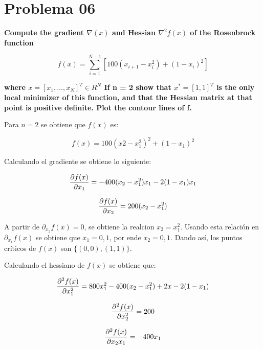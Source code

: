 \pagebreak

\section*{Problema 06}

\textbf{Compute the gradient $\nabla (x)$ and Hessian $\nabla^2 f (x)$ of the Rosenbrock function}

\begin{equation*}
    f(x) = \sum_{i=1}^{N-1}[100(x_{i+1}-x_i^2)+(1-x_i)^2]
\end{equation*}

\textbf{where $x = [x_1 ,\dots, x_N ]^T \in R^N$ If n = 2 show that $x^*  = [1, 1]^T$ is the only local minimizer of this function, and that the Hessian matrix at that point is positive definite. Plot the contour lines of f.}

Para $n=2$ se obtiene que $f(x)$ es:

\begin{equation*}
    f(x) = 100(x2-x_1^2)^2 +(1-x_1)^2
\end{equation*}

Calculando el gradiente se obtiene lo siguiente:

\begin{equation*}
    \frac{\partial f(x)}{\partial x_1} = -400(x_2-x_1^2)x_1 -2(1-x_1)x_1
\end{equation*}

\begin{equation*}
    \frac{\partial f(x)}{\partial x_2} = 200(x_2-x_1^2)
\end{equation*}

A partir de $\partial_{x_2} f(x)=0$, se obtiene la realcion $x_2=x_1^2$. Usando esta relación en $\partial_{x_1}f(x)$ se obtiene que $x_1=0,1$, por ende $x_2=0,1$. Dando así, los puntos críticos de $f(x)$ son $\{(0,0),(1,1)\}$.

Calculando el hessiano de $f(x)$ se obtiene que:

\begin{equation*}
    \frac{\partial ^2f(x)}{\partial x_1^2} = 800x_1^2 -400(x_2-x_1^2)+2x-2(1-x_1)
\end{equation*}

\begin{equation*}
    \frac{\partial ^2f(x)}{\partial x_2^2} = 200
\end{equation*}

\begin{equation*}
    \frac{\partial ^2f(x)}{\partial x_2x_1} = -400x_1
\end{equation*}

